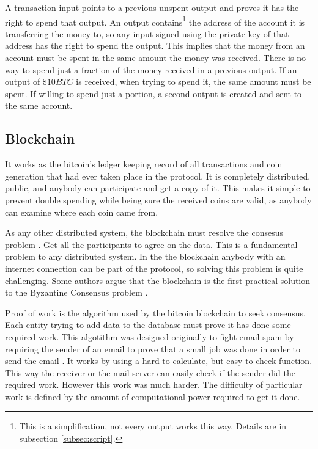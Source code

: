 A transaction input points to a previous unspent output and proves it has the
  right to spend that output.
An output contains\footnote{This is a simplification, not every output works
  this way. Details are in subsection \ref{subsec:script}.} the address of the
  account it is transferring the money to, so any input signed using the private
  key of that address has the right to spend the output.
This implies that the money from an account must be spent in the same amount
  the money was received. There is no way to spend just a fraction of the money
  received in a previous output. If an output of $\$ 10BTC$ is received, when
  trying to spend it, the same amount must be spent. If willing to spend just a
  portion, a second output is created and sent to the same account.

\subsection{Blockchain} \label{subsec:Blockchain}
It works as the bitcoin's ledger keeping record of all transactions and coin
  generation that had ever taken place in the protocol.
It is completely distributed, public, and anybody can participate and get a
  copy of it.
This makes it simple to prevent double spending while being sure the received
  coins are valid, as anybody can examine where each coin came from.

As any other distributed system, the blockchain must resolve the consesus
  problem \cite{fischer1983consensus}. Get all the participants to agree on
  the data. This is a fundamental problem to any distributed system. In the
  the blockchain anybody with an internet connection can be part of the
  protocol, so solving this problem is quite challenging. Some authors argue
  that the blockchain is the first practical solution to the Byzantine Consensus
  problem \cite{miller2014anonymous} \cite{sun2014solving}.

Proof of work is the algorithm used by the bitcoin blockchain to seek
  consensus. Each entity trying to add data to the database must prove it
  has done some required work. This algotithm was designed originally to fight
  email spam by requiring the sender of an email to prove that a small job was
  done in order to send the email \cite{dwork1992pricing}.
It works by using a hard to calculate, but easy to check function. This
  way the receiver or the mail server can easily check if the sender did
  the required work. However this work was much harder. The difficulty of
  particular work is defined by the amount of computational power required to
  get it done.

